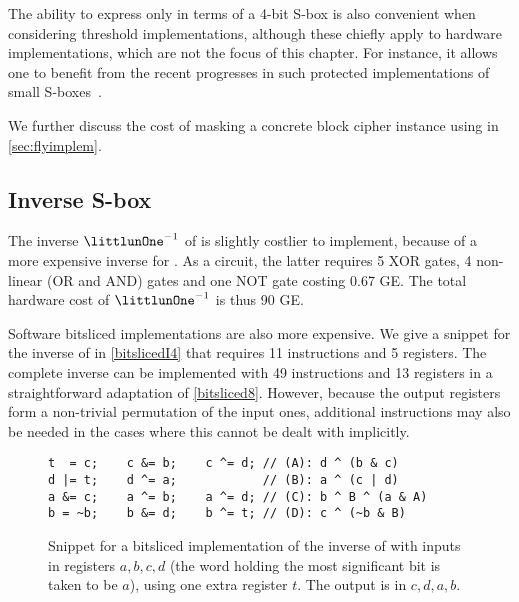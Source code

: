 The ability to express \littlunOne only in terms of a 4-bit S-box is also convenient when considering threshold implementations, although these chiefly apply to hardware implementations,
which are not the focus of this chapter.
For instance, it allows one to benefit from the recent progresses in such protected implementations of small S-boxes~\cite{ti-4bit}.

We further discuss the cost of masking a concrete block cipher instance using \littlunOne in \autoref{sec:flyimplem}.

\subsection{Inverse S-box}
The inverse $\littlunOne^{-1}$ of \littlunOne is slightly costlier to implement, because of a more expensive inverse for \littlunS. As a circuit, the latter requires 5 XOR gates, 4 non-linear (OR and AND) gates
and one NOT gate costing 0.67 GE. The total hardware cost of $\littlunOne^{-1}$ is thus 90 GE.

Software bitsliced implementations are also more expensive. We give a snippet for the inverse of \littlunS in
\autoref{bitslicedI4} that requires 11 instructions and 5 registers. The complete inverse can be implemented with 49 instructions and 13 registers in a straightforward adaptation of \autoref{bitsliced8}. However, because
the output registers form a non-trivial permutation of the input ones, additional instructions may also be needed in the cases where this cannot be dealt with implicitly.

\begin{figure}[ht]
\begin{verbatim}
t  = c;    c &= b;    c ^= d; // (A): d ^ (b & c)
d |= t;    d ^= a;            // (B): a ^ (c | d) 
a &= c;    a ^= b;    a ^= d; // (C): b ^ B ^ (a & A) 
b = ~b;    b &= d;    b ^= t; // (D): c ^ (~b & B)
\end{verbatim}
\caption[Snippet for a bitsliced \C implementation of the inverse of \littlunS.]{Snippet for a bitsliced \C implementation of the inverse of \littlunS \label{bitslicedI4} with inputs in registers $a,b,c,d$ (the word holding the most significant bit is taken to be $a$), using one extra register $t$.
The output is in $c,d,a,b$.}
\end{figure}
